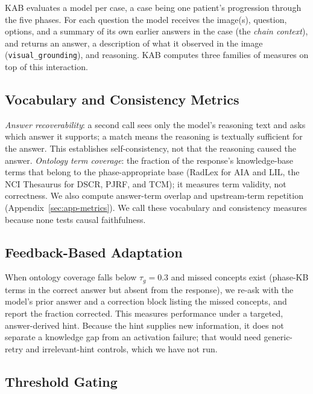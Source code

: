 \documentclass[11pt]{article}
\begin{document}
KAB evaluates a model per case, a case being one patient's progression through the five phases. For each question the model receives the image(s), question, options, and a summary of its own earlier answers in the case (the \emph{chain context}), and returns an answer, a description of what it observed in the image (\texttt{visual\_grounding}), and reasoning. KAB computes three families of measures on top of this interaction.

\subsection{Vocabulary and Consistency Metrics}
\label{sec:faithfulness}

\emph{Answer recoverability}: a second call sees only the model's reasoning text and asks which answer it supports; a match means the reasoning is textually sufficient for the answer. This establishes self-consistency, not that the reasoning caused the answer. \emph{Ontology term coverage}: the fraction of the response's knowledge-base terms that belong to the phase-appropriate base (RadLex for AIA and LIL, the NCI Thesaurus for DSCR, PJRF, and TCM); it measures term validity, not correctness. We also compute answer-term overlap and upstream-term repetition (Appendix~\ref{sec:app-metrics}). We call these vocabulary and consistency measures because none tests causal faithfulness.

\subsection{Feedback-Based Adaptation}
\label{sec:adaptation}

When ontology coverage falls below $\tau_g=0.3$ and missed concepts exist (phase-KB terms in the correct answer but absent from the response), we re-ask with the model's prior answer and a correction block listing the missed concepts, and report the fraction corrected. This measures performance under a targeted, answer-derived hint. Because the hint supplies new information, it does not separate a knowledge gap from an activation failure; that would need generic-retry and irrelevant-hint controls, which we have not run.

\subsection{Threshold Gating}
\label{sec:gating}
\end{document}
